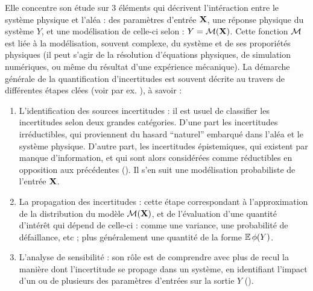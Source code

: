 Elle concentre son étude sur 3 éléments qui décrivent l'intéraction entre le système physique et l'aléa : des paramètres d'entrée $\mathbf{X}$, une réponse physique du système $ Y$, et une modélisation de celle-ci selon : $ Y=\mathcal{M}(\mathbf{X})$. %
Cette fonction $\mathcal{M}$ est liée à la modélisation, souvent complexe, du système et de ses proporiétés physiques (il peut s'agir de la résolution d'équations physiques, de simulation numériques, ou même du résultat d'une expérience mécanique).
%
La démarche générale de la quantification d'incertitudes est souvent décrite au travers de différentes étapes clées (voir par ex. \cite{sudret_uncertainty_2007, iooss_contributions_2009}), à savoir : %
%
\begin{enumerate}
    \item L'identification des sources incertitudes : 
        il est usuel de classifier les incertitudes selon deux grandes catégories. D'une part les incertitudes irréductibles, qui proviennent du hasard ``naturel'' embarqué dans l'aléa et le système physique. D'autre part, les incertitudes épistemiques, qui existent par manque d'information, et qui sont alors considérées comme réductibles en opposition aux précédentes (\cite{hullermeier_aleatoric_2019}). Il s'en suit une modélisation probabiliste de l'entrée $\mathbf{X}$. 
    \item La propagation des incertitudes : cette étape correspondant à l'approximation de la distribution du modèle $\mathcal{M}(\mathbf{X})$, et de l'évaluation d'une quantité d'intérêt qui dépend de celle-ci : comme une variance, une probabilité de défaillance, etc ; plus généralement une quantité de la forme $\mathbb{E}\,\phi( Y)$.
    \item L'analyse de sensibilité : son rôle est de comprendre avec plus de recul la manière dont l'incertitude se propage dans un système, en identifiant l'impact d'un ou de plusieurs des paramètres d'entrées sur la sortie $ Y$ (\cite{iooss_review_2015}).
\end{enumerate}



